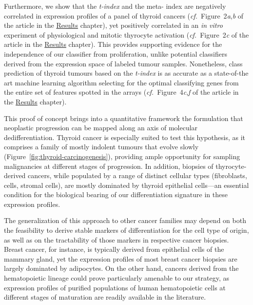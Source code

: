 Furthermore, we show that the \emph{t-index} and the meta- index
are negatively correlated in expression profiles of a panel of thyroid cancers
(\mbox{\emph{cf.} Figure~2\emph{a},\emph{b}} of the article in the
\hyperref[chap:results]{\textsf{Results}} chapter), yet positively correlated in
an \emph{in vitro} experiment of physiological and mitotic thyrocyte activation
(\mbox{\emph{cf.} Figure~2\emph{c}} of the article in the
\hyperref[chap:results]{\textsf{Results}} chapter).  This provides supporting
evidence for the independence of our classifier from proliferation, unlike
potential classifiers derived from the expression space of labeled tumour
samples.  Nonetheless, class prediction of thyroid tumours based on the
\emph{t-index} is as accurate as a state-of-the art machine learning algorithm
selecting for the optimal classifying genes from the entire set of features
spotted in the arrays (\mbox{\emph{cf.} Figure~4\emph{c},\emph{f}} of the
article in the \hyperref[chap:results]{\textsf{Results}} chapter).

This proof of concept brings into a quantitative framework the formulation that
neoplastic progression can be mapped along an axis of molecular
dedifferentiation.  Thyroid cancer is especially suited to test this hypothesis,
as it comprises a family of mostly indolent tumours that evolve slowly
(Figure~\ref{fig:thyroid-carcinogenesis}), providing ample opportunity for
sampling malignancies at different stages of progression.  In addition, biopsies
of thyrocyte-derived cancers, while populated by a range of distinct cellular
types (fibroblasts,  cells, stromal cells), are mostly dominated by
thyroid epithelial cells---an essential condition for the biological bearing of
our differentiation signature in these expression profiles.

The generalization of this approach to other cancer families may depend on both
the feasibility to derive stable markers of differentiation for the cell type of
origin, as well as on the tractability of those markers in respective cancer
biopsies.  Breast cancer, for instance, is typically derived from epithelial
cells of the mammary gland, yet the expression profiles of most breast cancer
biopsies are largely dominated by adipocytes.  On the other hand, cancers
derived from the hematopoietic lineage could prove particularly amenable to our
strategy, as expression profiles of purified populations of human hematopoietic
cells at different stages of maturation are readily available in the
literature.\cite{novershtern_densely_2011}

